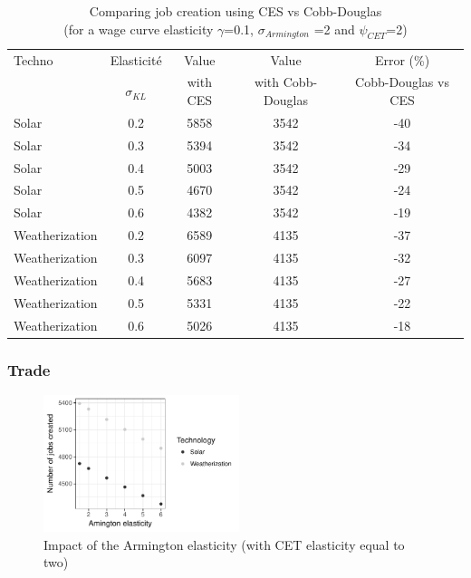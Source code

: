 \begin{table}[!ht]
	\centering
	\caption{Comparing job creation using CES vs Cobb-Douglas \\\hspace{\textwidth} (for a wage curve elasticity $\gamma$=0.1, $\sigma_{Armington}$ =2  and $\psi_{CET}$=2)}
	\label{tab:CobbDouglasError}
	\begin{tabular}{lcccc}
		\toprule
		Techno & Elasticité  &  Value & Value & Error (\%) \\
	    & $\sigma_{KL}$ &  with CES & with Cobb-Douglas& Cobb-Douglas vs CES \\
		\midrule 
		Solar & 0.2 &  5858 & 3542 & -40 \\
Solar & 0.3 &5394 & 3542 & -34 \\
Solar & 0.4 & 5003 & 3542 & -29 \\
Solar & 0.5 & 4670 & 3542 & -24 \\
Solar & 0.6 & 4382 & 3542 & -19 \\
Weatherization & 0.2 & 6589 & 4135 & -37 \\
Weatherization & 0.3 & 6097 & 4135 & -32 \\
Weatherization & 0.4 & 5683 & 4135 & -27 \\
Weatherization & 0.5 & 5331 & 4135 & -22 \\
Weatherization & 0.6 & 5026 & 4135 & -18 \\
		\bottomrule
	\end{tabular}
\end{table}

\clearpage

\subsubsection{Trade}

\begin{figure}[!ht]
	\centering
	\includegraphics[height=4cm]{figures/Armington.pdf}
	\caption{Impact of the Armington elasticity (with CET elasticity equal to two)}
	\label{fig:armington}
\end{figure}

